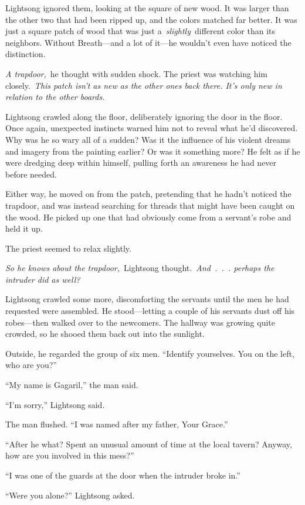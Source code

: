 Lightsong ignored them, looking at the square of new wood. It was larger than the other two that had been ripped up, and the colors matched far better. It was just a square patch of wood that was just a~\textit{slightly}~different color than its neighbors. Without Breath—and a lot of it—he wouldn’t even have noticed the distinction.

\textit{A trapdoor,}~he thought with sudden shock. The priest was watching him closely.~\textit{This patch isn’t as new as the other ones back there. It’s only new in relation to the other boards.}

Lightsong crawled along the floor, deliberately ignoring the door in the floor. Once again, unexpected instincts warned him not to reveal what he’d discovered. Why was he so wary all of a sudden? Was it the influence of his violent dreams and imagery from the painting earlier? Or was it something more? He felt as if he were dredging deep within himself, pulling forth an awareness he had never before needed.

Either way, he moved on from the patch, pretending that he hadn’t noticed the trapdoor, and was instead searching for threads that might have been caught on the wood. He picked up one that had obviously come from a servant’s robe and held it up.

The priest seemed to relax slightly.

\textit{So he knows about the trapdoor,}~Lightsong thought.~\textit{And~.~.~. perhaps the intruder did as well?}

Lightsong crawled some more, discomforting the servants until the men he had requested were assembled. He stood—letting a couple of his servants dust off his robes—then walked over to the newcomers. The hallway was growing quite crowded, so he shooed them back out into the sunlight.

Outside, he regarded the group of six men. “Identify yourselves. You on the left, who are you?”

“My name is Gagaril,” the man said.

“I’m sorry,” Lightsong said.

The man flushed. “I was named after my father, Your Grace.”

“After he what? Spent an unusual amount of time at the local tavern? Anyway, how are you involved in this mess?”

“I was one of the guards at the door when the intruder broke in.”

“Were you alone?” Lightsong asked.

